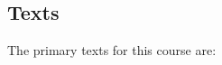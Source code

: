\documentclass[11pt,twoside]{article}
\numberwithin{equation}{section}
\newcommand{\?}{\stackrel{?}{=}}
\begin{document}

\subsection{Texts}
The primary texts for this course are:
\end{document}
